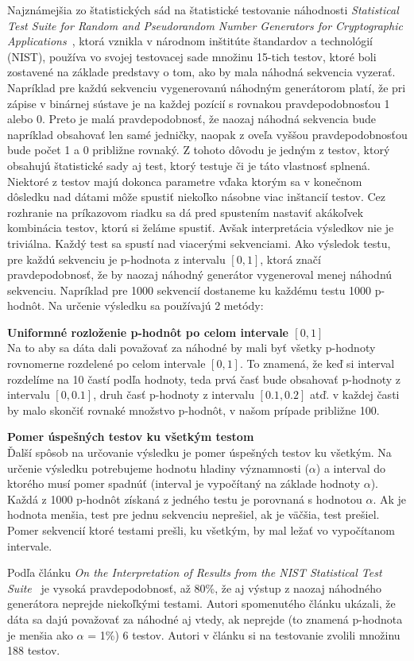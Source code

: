 Najznámejšia zo štatistických sád na štatistické testovanie náhodnosti \textit{Statistical Test Suite for Random and Pseudorandom Number Generators for Cryptographic Applications}~\parencite{nist-sts-documentation}, ktorá vznikla v národnom inštitúte štandardov a technológií (NIST), používa vo svojej testovacej sade množinu 15-tich testov, ktoré boli zostavené na základe predstavy o tom, ako by mala náhodná sekvencia vyzerať. Napríklad pre každú sekvenciu vygenerovanú náhodným generátorom platí, že pri zápise v binárnej sústave je na každej pozícií s rovnakou pravdepodobnosťou 1 alebo 0. Preto je malá pravdepodobnosť, že naozaj náhodná sekvencia bude napríklad obsahovať len samé jedničky, naopak z oveľa vyššou pravdepodobnosťou bude počet 1 a 0 približne rovnaký. Z tohoto dôvodu je jedným z testov, ktorý obsahujú štatistické sady aj test, ktorý testuje či je táto vlastnosť splnená. Niektoré z testov majú dokonca parametre vďaka ktorým sa v konečnom dôsledku nad dátami môže spustiť niekoľko násobne viac inštancií testov. Cez rozhranie na príkazovom riadku sa dá pred spustením nastaviť akákoľvek kombinácia testov, ktorú si želáme spustiť. Avšak interpretácia výsledkov nie je triviálna. Každý test sa spustí nad viacerými sekvenciami. Ako výsledok testu, pre každú sekvenciu je p-hodnota z intervalu $[0, 1]$, ktorá značí pravdepodobnosť, že by naozaj náhodný generátor vygeneroval menej náhodnú sekvenciu. Napríklad pre 1000 sekvencií dostaneme ku každému testu 1000 p-hodnôt. Na určenie výsledku sa používajú 2 metódy:
\begin{myItemize}
	\item \textbf{Uniformné rozloženie p-hodnôt po celom intervale $[0, 1]$}\\Na to aby sa dáta dali považovať za náhodné by mali byť všetky p-hodnoty rovnomerne rozdelené po celom intervale $[0, 1]$. To znamená, že keď si interval rozdelíme na 10 častí podľa hodnoty, teda prvá časť bude obsahovať p-hodnoty z intervalu $[0, 0.1]$, druh časť p-hodnoty z intervalu $[0.1, 0.2]$ atď. v každej časti by malo skončiť rovnaké množstvo p-hodnôt, v našom prípade približne 100.
	\item \textbf{Pomer úspešných testov ku všetkým testom}\\Ďalší spôsob na určovanie výsledku je pomer úspešných testov ku všetkým. Na určenie výsledku potrebujeme hodnotu hladiny významnosti ($\alpha$) a interval do ktorého musí pomer spadnúť (interval je vypočítaný na základe hodnoty $\alpha$). Každá z 1000 p-hodnôt získaná z jedného testu je porovnaná s hodnotou $\alpha$. Ak je hodnota menšia, test pre jednu sekvenciu neprešiel, ak je väčšia, test prešiel. Pomer sekvencií ktoré testami prešli, ku všetkým, by mal ležať vo vypočítanom intervale.
\end{myItemize}
Podľa článku \textit{On the Interpretation of Results from the NIST Statistical Test Suite}~\parencite{nist-sts-interpretation-syso} je vysoká pravdepodobnosť, až 80\%, že aj výstup z naozaj náhodného generátora neprejde niekoľkými testami. Autori spomenutého článku ukázali, že dáta sa dajú považovať za náhodné aj vtedy, ak neprejde (to znamená p-hodnota je menšia ako $\alpha$ = 1\%) 6 testov. Autori v článku si na testovanie zvolili množinu 188 testov.


